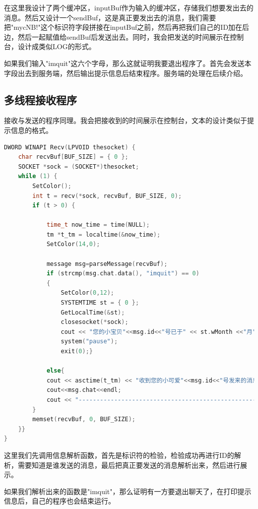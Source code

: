 \documentclass[UTF8,a4paper,10pt]{ctexart}
\begin{document}
在这里我设计了两个缓冲区，inputBuf作为输入的缓冲区，存储我们想要发出去的消息。然后又设计一个sendBuf，这是真正要发出去的消息，我们需要把"mycNB!"这个标识符字段拼接在inputBuf之前，然后再把我们自己的ID加在后边，然后一起赋值给sendBuf后发送出去。同时，我会把发送的时间展示在控制台，设计成类似LOG的形式。\par
如果我们输入"imquit"这六个字母，那么这就证明我要退出程序了。首先会发送本字段出去到服务端，然后输出提示信息后结束程序。服务端的处理在后续介绍。
\subsection{多线程接收程序}
接收与发送的程序同理。我会把接收到的时间展示在控制台，文本的设计类似于提示信息的格式。
\begin{lstlisting}[frame=trbl,language={C++}]
DWORD WINAPI Recv(LPVOID thesocket) {
    char recvBuf[BUF_SIZE] = { 0 };
    SOCKET *sock = (SOCKET*)thesocket;
    while (1) {
        SetColor();
        int t = recv(*sock, recvBuf, BUF_SIZE, 0);
        if (t > 0) {

            time_t now_time = time(NULL);
            tm *t_tm = localtime(&now_time);
            SetColor(14,0);

            message msg=parseMessage(recvBuf);
            if (strcmp(msg.chat.data(), "imquit") == 0)
            {
                SetColor(0,12);
                SYSTEMTIME st = { 0 };
                GetLocalTime(&st);
                closesocket(*sock);
                cout << "您的小宝贝"<<msg.id<<"号已于" << st.wMonth <<"月"<< st.wDay << "日" << st.wHour << "时" << st.wMinute << "分" << st.wSecond << "说再见了哟！（//▽//）" << endl;
                system("pause");
                exit(0);}

            else{
            cout << asctime(t_tm) << "收到您的小可爱"<<msg.id<<"号发来的消息:";
            cout<<msg.chat<<endl;
            cout << "-------------------------------------------------------------" << endl;
        }
        memset(recvBuf, 0, BUF_SIZE);
    }}
}

\end{lstlisting}

这里我们先调用信息解析函数，首先是标识符的检验，检验成功再进行ID的解析，需要知道是谁发送的消息，最后把真正要发送的消息解析出来，然后进行展示。\par
如果我们解析出来的函数是"imquit"，那么证明有一方要退出聊天了，在打印提示信息后，自己的程序也会结束运行。
\end{document}

